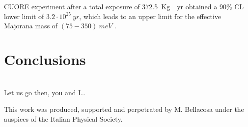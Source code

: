 \documentclass{subnucbo}
\begin{document}
CUORE experiment after a total exposure of \SI{372.5}{Kg\cdot yr} obtained a 90\% CL lower limit of $3.2\cdot10^{25}\SI{}{yr}$, which leads to an upper limit for the effective Majorana mass of $(75-350)\SI{}{meV}$ \cite{ref:cuore}.


\section{Conclusions}


\appendix

\section{}
Let us go then, you and I\ldots

\acknowledgments
This work was produced, supported and perpetrated by M. Bellacosa under
the auspices of the Italian Physical Society.
\end{document}
